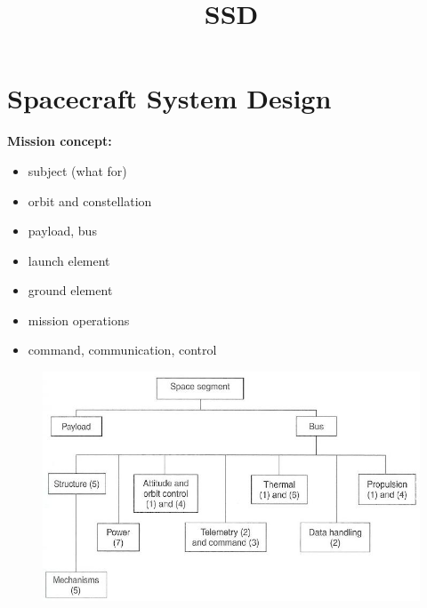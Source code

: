 \documentclass[a4paper,10pt]{article}
\title{SSD}
\author{}
\date{}
\newcommand{\f}{\textbf}
\begin{document}
\maketitle

\section{Spacecraft System Design}
\f{Mission concept:} 
\begin{itemize}
 \item subject (what for)
 \item orbit and constellation
 \item payload, bus
 \item launch element
 \item ground element
 \item mission operations
 \item command, communication, control
\end{itemize}
\begin{figure}[ht!]
 \centering
 \includegraphics[scale=0.6]{overview}
\end{figure}
\end{document}
